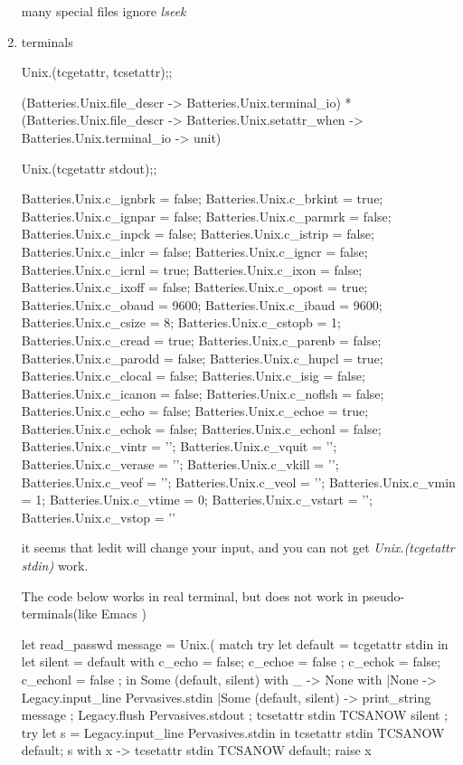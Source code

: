 \begin{enumerate}
many special files ignore \textit{lseek}
\item terminals \\

  \begin{alternate}
Unix.(tcgetattr, tcsetattr);;
\end{alternate}
\begin{bluecode}
(Batteries.Unix.file_descr -> Batteries.Unix.terminal_io) *
(Batteries.Unix.file_descr ->
     Batteries.Unix.setattr_when -> Batteries.Unix.terminal_io -> unit)
\end{bluecode}
  
  \begin{alternate}
Unix.(tcgetattr stdout);;    
\end{alternate}

\begin{bluecode}
{Batteries.Unix.c_ignbrk = false; Batteries.Unix.c_brkint = true;
 Batteries.Unix.c_ignpar = false; Batteries.Unix.c_parmrk = false;
 Batteries.Unix.c_inpck = false; Batteries.Unix.c_istrip = false;
 Batteries.Unix.c_inlcr = false; Batteries.Unix.c_igncr = false;
 Batteries.Unix.c_icrnl = true; Batteries.Unix.c_ixon = false;
 Batteries.Unix.c_ixoff = false; Batteries.Unix.c_opost = true;
 Batteries.Unix.c_obaud = 9600; Batteries.Unix.c_ibaud = 9600;
 Batteries.Unix.c_csize = 8; Batteries.Unix.c_cstopb = 1;
 Batteries.Unix.c_cread = true; Batteries.Unix.c_parenb = false;
 Batteries.Unix.c_parodd = false; Batteries.Unix.c_hupcl = true;
 Batteries.Unix.c_clocal = false; Batteries.Unix.c_isig = false;
 Batteries.Unix.c_icanon = false; Batteries.Unix.c_noflsh = false;
 Batteries.Unix.c_echo = false; Batteries.Unix.c_echoe = true;
 Batteries.Unix.c_echok = false; Batteries.Unix.c_echonl = false;
 Batteries.Unix.c_vintr = ''; Batteries.Unix.c_vquit = '';
 Batteries.Unix.c_verase = ''; Batteries.Unix.c_vkill = '';
 Batteries.Unix.c_veof = ''; Batteries.Unix.c_veol = '';
 Batteries.Unix.c_vmin = 1; Batteries.Unix.c_vtime = 0;
 Batteries.Unix.c_vstart = ''; Batteries.Unix.c_vstop = ''}  
\end{bluecode}

it seems that ledit will change your input, and you can not get
\textit{Unix.(tcgetattr stdin)} work.

The code below works in real terminal, but does not work in
pseudo-terminals(like Emacs )

\begin{bluecode}
let read_passwd message = Unix.(
match 
   try 
    let default = tcgetattr stdin in 
    let silent = {default with c_echo = false; c_echoe = false ; 
                  c_echok = false; c_echonl = false ; } in 
     Some (default, silent)
   with _ -> None 
with
 |None -> Legacy.input_line Pervasives.stdin 
 |Some (default, silent) -> 
   print_string message ; 
   Legacy.flush Pervasives.stdout ; 
   tcsetattr stdin TCSANOW silent ; 
   try 
     let s = Legacy.input_line Pervasives.stdin in 
     tcsetattr stdin TCSANOW default; s 
   with x ->      tcsetattr stdin TCSANOW default; raise x 
    

\end{bluecode}
\end{enumerate}
